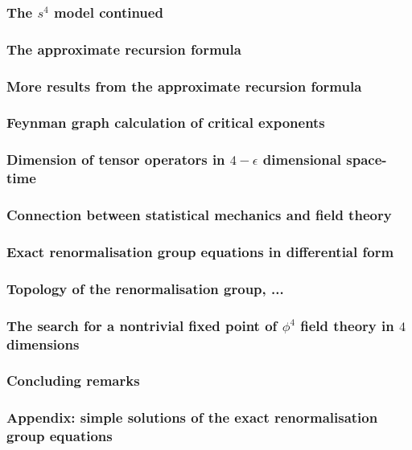 \documentclass[11pt]{amsart}
\theoremstyle{plain}%
\theoremstyle{definition}
\theoremstyle{remark}
\begin{document}
\subsubsection{The $s^4$ model continued}
\subsubsection{The approximate recursion formula}
\subsubsection{More results from the approximate recursion formula}
\subsubsection{Feynman graph calculation of critical exponents}
\subsubsection{Dimension of tensor operators in $4-\epsilon$ dimensional space-time}
\subsubsection{Connection between statistical mechanics and field theory}
\subsubsection{Exact renormalisation group equations in differential form}
\subsubsection{Topology of the renormalisation group, ...}
\subsubsection{The search for a nontrivial fixed point of $\phi^4$ field theory in $4$ dimensions}
\subsubsection{Concluding remarks}
\subsubsection{Appendix: simple solutions of the exact renormalisation group equations}
\end{document}

